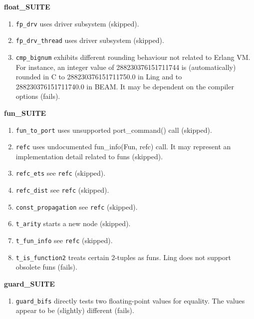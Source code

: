 \documentclass{article}
\begin{document}
\textbf{float\_SUITE}
\begin{enumerate}
\item \texttt{fp\_drv} uses driver subsystem (skipped).
\item \texttt{fp\_drv\_thread} uses driver subsystem (skipped).
\item \texttt{cmp\_bignum} exhibits different rounding behaviour not related to
Erlang VM. For instance, an integer value of 288230376151711744 is (automatically)
rounded in C to 288230376151711750.0 in Ling and to \\288230376151711740.0 in
BEAM. It may be dependent on the compiler options (fails).
\end{enumerate}

\textbf{fun\_SUITE}
\begin{enumerate}
\item \texttt{fun\_to\_port} uses unsupported port\_command() call (skipped).
\item \texttt{refc} uses undocumented fun\_info(Fun, refc) call. It may
represent an implementation detail related to funs (skipped).
\item \texttt{refc\_ets} see \texttt{refc} (skipped).
\item \texttt{refc\_dist} see \texttt{refc} (skipped).
\item \texttt{const\_propagation} see \texttt{refc} (skipped).
\item \texttt{t\_arity} starts a new node (skipped).
\item \texttt{t\_fun\_info} see \texttt{refc} (skipped).
\item \texttt{t\_is\_function2} treats certain 2-tuples as funs. Ling does not
support obsolete funs (fails).
\end{enumerate}

\textbf{guard\_SUITE}
\begin{enumerate}
\item \texttt{guard\_bifs} directly tests two floating-point values for
equality. The values appear to be (slightly) different (fails).
\end{enumerate}
\end{document}
